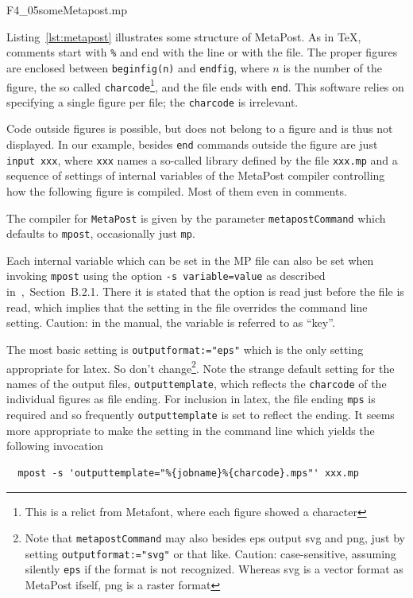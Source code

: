
{F4_05someMetapost.mp}

Listing~\ref{lst:metapost} illustrates some structure of MetaPost. 
As in \TeX, comments start with \texttt{\%} and end with the line or with the file. 
The proper figures are enclosed between \texttt{beginfig(n)} and \texttt{endfig}, %
where $n$ is the number of the figure, the so called \texttt{charcode}\footnote%
{This is a relict from Metafont, where each figure showed a character}, 
and the file ends with \texttt{end}. 
This software relies on specifying a single figure per file; the \texttt{charcode} is irrelevant. 

Code outside figures is possible, but does not belong to a figure 
and is thus not displayed. 
In our example, besides \texttt{end} commands outside the figure 
are just \texttt{input xxx}, where \texttt{xxx} names a so-called library 
defined by the file \texttt{xxx.mp} 
and a sequence of settings of internal variables 
of the MetaPost compiler 
controlling how the following figure is compiled. 
Most of them even in comments. 

The compiler for \texttt{MetaPost} 
is given by the parameter \texttt{metapostCommand} 
which defaults to \texttt{mpost}, occasionally just \texttt{mp}. 

Each internal variable which can be set in the MP file 
can also be set when invoking \texttt{mpost} 
using the option \texttt{-s \textlangle{}variable\textrangle=\textlangle{}value\textrangle} 
as described in~\cite{MPost24},~Section~B.2.1. 
There it is stated that the option is read just before the file is read, 
which implies that the setting in the file overrides the command line setting. 
Caution: in the manual, the variable is referred to as ``key''. 

The most basic setting is \texttt{outputformat:="eps"} %
which is the only setting appropriate for latex. 
So don't change\footnote%
{Note that \texttt{metapostCommand} may also besides \gls{eps} 
output \gls{svg} and \gls{png}, 
just by setting \texttt{outputformat:="svg"} or that like. %
Caution: case-sensitive, assuming silently \texttt{eps} if the format is not recognized. 
Whereas \gls{svg} is a vector format as MetaPost ifself, \gls{png} is a raster format}. 
Note the strange default setting for the names of the output files, \texttt{outputtemplate}, 
which reflects the \texttt{charcode} of the individual figures as file ending. 
For inclusion in latex, the file ending \texttt{mps} is required 
and so frequently \texttt{outputtemplate} is set to reflect the ending. 
It seems more appropriate to make the setting in the command line 
which yields the following invocation
%
\begin{verbatim}
  mpost -s 'outputtemplate="%{jobname}%{charcode}.mps"' xxx.mp
\end{verbatim}

